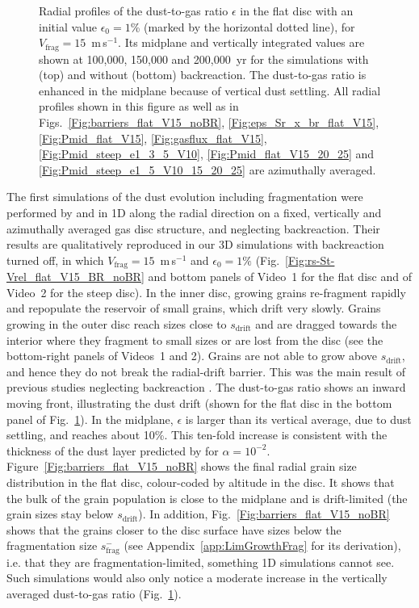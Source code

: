 \documentclass[a4paper,fleqn,usenatbib]{mnras}
\newcommand{\Vfrag}{V_\mathrm{frag}}  %
\begin{document}
\begin{figure}
\centering
{}
\caption{Radial profiles of the dust-to-gas ratio $\epsilon$ in the flat disc with an initial value $\epsilon_0=1$\% (marked by the horizontal dotted line), for $\Vfrag=15$~m\,s$^{-1}$. Its midplane and vertically integrated values are shown at 100,000, 150,000 and 200,000~yr for the simulations with (top) and without (bottom) backreaction. The dust-to-gas ratio is enhanced in the midplane because of vertical dust settling. All radial profiles shown in this figure as well as in Figs.~\ref{Fig:barriers_flat_V15_noBR}, \ref{Fig:eps_Sr_x_br_flat_V15}, \ref{Fig:Pmid_flat_V15}, \ref{Fig:gasflux_flat_V15}, \ref{Fig:Pmid_steep_e1_3_5_V10}, \ref{Fig:Pmid_flat_V15_20_25} and \ref{Fig:Pmid_steep_e1_5_V10_15_20_25} are azimuthally averaged.}
\label{Fig:epsilon_flat_V15}
\end{figure}

The first simulations of the dust evolution including fragmentation were performed by \citet{Brauer2008} and \citet{Birnstiel2010} in 1D along the radial direction on a fixed, vertically and azimuthally averaged gas disc structure, and neglecting backreaction. Their results are qualitatively reproduced in our 3D simulations with backreaction turned off, in which $\Vfrag=15$~m\,s$^{-1}$ and $\epsilon_0=1\%$ (Fig.~\ref{Fig:rs-St-Vrel_flat_V15_BR_noBR} and bottom panels of Video~1 for the flat disc and of Video~2 for the steep disc). In the inner disc, growing grains re-fragment rapidly and repopulate the reservoir of small grains, which drift very slowly. Grains growing in the outer disc reach sizes close to $s_\mathrm{drift}$ and are dragged towards the interior where they fragment to small sizes or are lost from the disc (see the bottom-right panels of Videos~1 and 2). Grains are not able to grow above $s_\mathrm{drift}$, and hence they do not break the radial-drift barrier. This was the main result of previous studies neglecting backreaction \citep{Brauer2008,Birnstiel2010}. The dust-to-gas ratio shows an inward moving front, illustrating the dust drift (shown for the flat disc in the bottom panel of Fig.~\ref{Fig:epsilon_flat_V15}). In the midplane, $\epsilon$ is larger than its vertical average, due to dust settling, and reaches about 10\%. This ten-fold increase is consistent with the thickness of the dust layer predicted by \citet{Dubrulle1995} for $\alpha=10^{-2}$. Figure~\ref{Fig:barriers_flat_V15_noBR} shows the final radial grain size distribution in the flat disc, colour-coded by altitude in the disc. It shows that the bulk of the grain population is close to the midplane and is drift-limited (the grain sizes stay below $s_\mathrm{drift}$). In addition, Fig.~\ref{Fig:barriers_flat_V15_noBR} shows that the grains closer to the disc surface have sizes below the fragmentation size $s_\mathrm{frag}^-$ (see Appendix~\ref{app:LimGrowthFrag} for its derivation), i.e. that they are fragmentation-limited, something 1D simulations cannot see. Such simulations would also only notice a moderate increase in the vertically averaged dust-to-gas ratio (Fig.~\ref{Fig:epsilon_flat_V15}).
\end{document}
